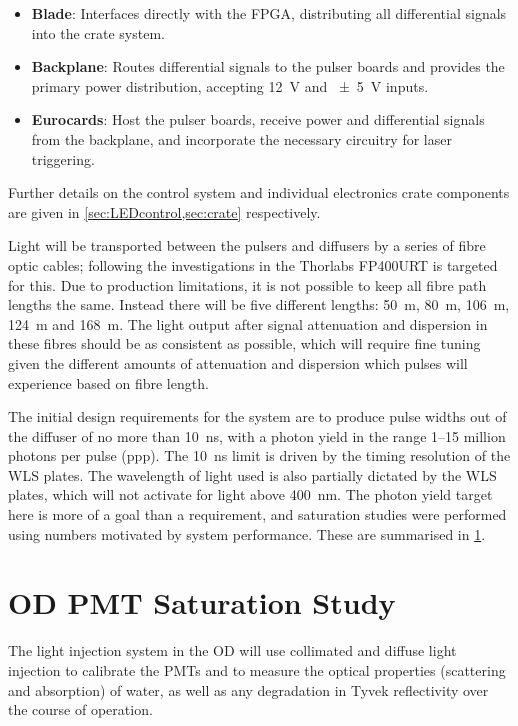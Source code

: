 \documentclass[a4paper,11pt]{article}
\begin{document}
\begin{itemize}
\item \textbf{Blade}: Interfaces directly with the FPGA, distributing all differential signals into the crate system.
\item \textbf{Backplane}: Routes differential signals to the pulser boards and provides the primary power distribution, accepting \SI{12}{\volt} and \SI{\pm5}{\volt} inputs.
\item \textbf{Eurocards}: Host the pulser boards, receive power and differential signals from the backplane, and incorporate the necessary circuitry for laser triggering.
\end{itemize}
Further details on the control system and individual electronics crate components are given in \cref{sec:LEDcontrol,sec:crate} respectively.

Light will be transported between the pulsers and diffusers by a series of fibre optic cables; following the investigations in \cite{TN91} the Thorlabs FP400URT \cite{FP400URT} is targeted for this. Due to production limitations, it is not possible to keep all fibre path lengths the same. Instead there will be five different lengths: 50~m, 80~m, 106~m, 124~m and 168~m. The light output after signal attenuation and dispersion in these fibres should be as consistent as possible, which will require fine tuning given the different amounts of attenuation and dispersion which pulses will experience based on fibre length.

The initial design requirements for the system are to produce pulse widths out of the diffuser of no more than 10~ns, with a photon yield in the range 1--15 million photons per pulse (ppp). The 10~ns limit is driven by the timing resolution of the WLS plates. The wavelength of light used is also partially dictated by the WLS plates, which will not activate for light above 400~nm. The photon yield target here is more of a goal than a requirement, and saturation studies were performed using numbers motivated by system performance. These are summarised in \cref{sec:saturation}.


\section{OD PMT Saturation Study}\label{sec:saturation}

The light injection system in the OD will use collimated and diffuse light injection to calibrate the PMTs and to measure the optical properties (scattering and absorption) of water, as well as any degradation in Tyvek reflectivity over the course of operation. 
\end{document}
